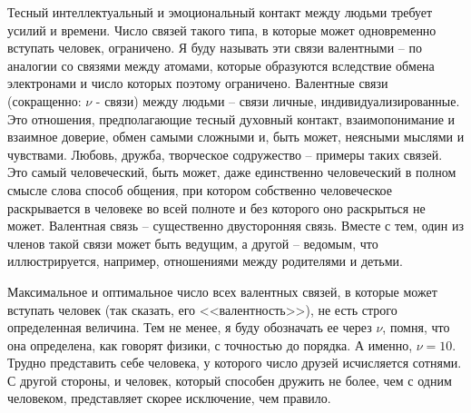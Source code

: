 \documentclass{book}
\begin{document}
Тесный интеллектуальный и эмоциональный контакт между людьми требует усилий и времени. Число связей такого типа, в которые может одновременно вступать человек, ограничено. Я буду называть эти связи валентными --  по аналогии со связями между атомами, которые образуются вследствие обмена электронами и число которых поэтому ограничено. Валентные связи (сокращенно: $\nu$ -  связи) между людьми -- связи личные, индивидуализированные. Это отношения, предполагающие тес­ный духовный контакт, взаимопонимание и взаимное доверие, обмен самыми сложными и, быть может, неясными мыслями и чувствами. Любовь, дружба, творческое содружество -- при­меры таких связей. Это самый человеческий, быть может, даже единственно человеческий в полном смысле слова способ обще­ния, при котором собственно человеческое раскрывается в чело­веке во всей полноте и без которого оно раскрыться не может. Валентная связь -- существенно двусторонняя связь. Вместе с тем, один из членов такой связи может быть ведущим, а другой -- ведомым, что 
иллюстрируется, например, отношениями между родителями и детьми.

Максимальное и оптимальное число всех валентных связей, в которые может вступать человек (так сказать, его <<валент­ность>>), не есть строго определенная величина. Тем не менее, я буду обозначать ее через $\nu$,  помня, что она определена, как го­ворят физики, с точностью до порядка. А именно, $\nu = 10$. Трудно представить себе человека, у которого число друзей исчисляется сотнями. С другой стороны, и человек, который спо­собен дружить не более, чем с одним человеком, представляет скорее исключение, чем правило.
\end{document}
